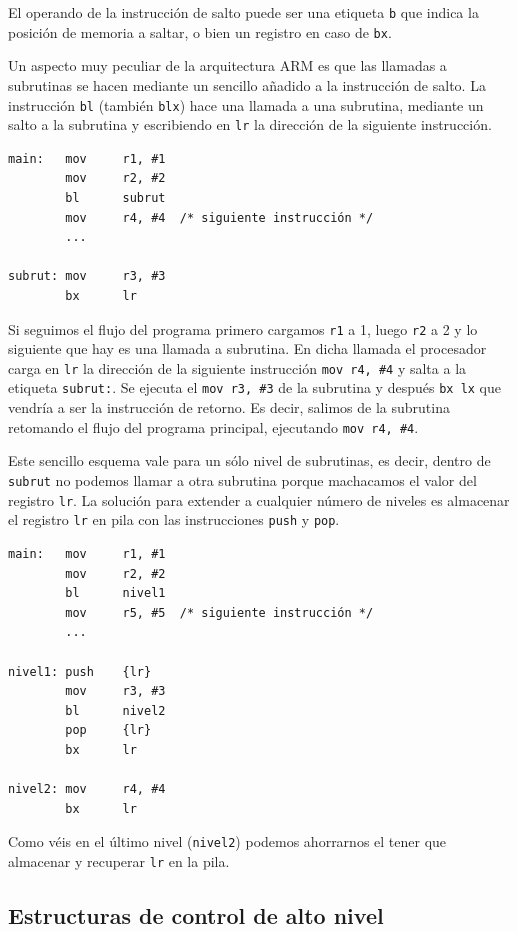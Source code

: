 El operando de la instrucción de salto puede ser una etiqueta {\tt b} que indica la
posición de memoria a saltar, o bien un registro en caso de {\tt bx}.

Un aspecto muy peculiar de la arquitectura ARM es que las llamadas a
subrutinas se hacen mediante un sencillo añadido a la instrucción de salto. La
instrucción {\tt bl} (también {\tt blx}) hace una llamada a una subrutina,
mediante un salto a la subrutina y escribiendo en {\tt lr} la dirección de la
siguiente instrucción.

\begin{lstlisting}
main:   mov     r1, #1
        mov     r2, #2
        bl      subrut
        mov     r4, #4  /* siguiente instrucción */
        ...

subrut: mov     r3, #3
        bx      lr
\end{lstlisting}

Si seguimos el flujo del programa primero cargamos {\tt r1} a 1, luego {\tt r2}
a 2 y lo siguiente que hay es una llamada a subrutina. En dicha llamada el
procesador carga en {\tt lr} la dirección de la siguiente instrucción {\tt mov r4, \#4}
y salta a la etiqueta {\tt subrut:}. Se ejecuta el {\tt mov r3, \#3} de la subrutina
y después {\tt bx lx} que vendría a ser la instrucción de retorno. Es decir, salimos
de la subrutina retomando el flujo del programa principal, ejecutando {\tt mov r4, \#4}.

Este sencillo esquema vale para un sólo nivel de subrutinas, es decir, dentro de
{\tt subrut} no podemos llamar a otra subrutina porque machacamos el valor del
registro {\tt lr}. La solución para extender a cualquier número de niveles es almacenar
el registro {\tt lr} en pila con las instrucciones {\tt push} y {\tt pop}.

\begin{lstlisting}
main:   mov     r1, #1
        mov     r2, #2
        bl      nivel1
        mov     r5, #5  /* siguiente instrucción */
        ...

nivel1: push    {lr}
        mov     r3, #3
        bl      nivel2
        pop     {lr}
        bx      lr

nivel2: mov     r4, #4
        bx      lr
\end{lstlisting}

Como véis en el último nivel ({\tt nivel2}) podemos ahorrarnos el tener que
almacenar y recuperar {\tt lr} en la pila.



\subsection{Estructuras de control de alto nivel}

